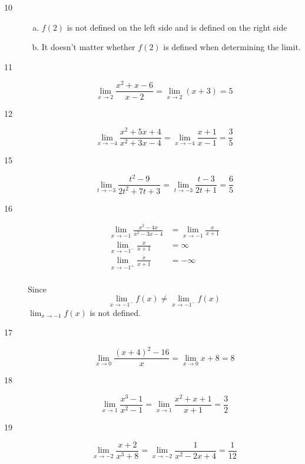 \documentclass[letterpaper, landscape]{exam}
\begin{document}
\begin{description}
      \item[10]
        \begin{enumerate}[(a)]
          \item $f(2)$ is not defined on the left side and is defined on the
            right side

          \item It doesn't matter whether $f(2)$ is defined when determining the
            limit.
        \end{enumerate}

      \item[11]
        \[
          \lim_{x \to 2} \frac{x^2 + x - 6}{x - 2} 
            = \lim_{x \to 2} (x + 3) = \boxed{ 5 } 
        \]

      \item[12]
        \[
          \lim_{x \to -4} \frac{x^2+5 x+4}{x^2+3 x-4} 
            = \lim_{x \to -4} \frac{x+1}{x-1} = \boxed{ \frac{3}{5} } 
        \]

      \item[15]
        \[
          \lim_{t \to -3} \frac{t^2-9}{2 t^2+7 t+3}            
            = \lim_{t \to -3} \frac{t-3}{2 t+1} = \boxed{ \frac{6}{5} } 
        \]

      \item[16]
        \begin{align*}
          \lim_{x \to -1} \frac{x^2-4 x}{x^2-3 x-4} & = \lim_{x \to -1} \frac{x}{x+1}
          \\
          \lim_{x \to -1^-} \frac{x}{x+1}           & = \infty \\
          \lim_{x \to -1^+} \frac{x}{x+1}           & = -\infty \\
        \end{align*}

        Since 
        \[
          \lim_{x \to -1^-} f(x) \neq \lim_{x \to -1^-} f(x)
        \]
        $\lim_{x \to -1} f(x)$ is not defined.

      \item[17]
        \[
          \lim_{x \to 0} \frac{(x+4)^2-16}{x} 
            = \lim_{x \to 0} x + 8 = \boxed{ 8 } 
        \]

      \item[18]
        \[
          \lim_{x \to 1} \frac{x^3-1}{x^2-1} 
            = \lim_{x \to 1} \frac{x^2+x+1}{x+1} = \boxed{ \frac{3}{2} } 
        \]

      \item[19]
        \[
          \lim_{x \to -2} \frac{x+2}{x^3+8} 
            = \lim_{x \to -2} \frac{1}{x^2-2 x+4} = \boxed{ \frac{1}{12} } 
        \]


\end{description}
\end{document}
